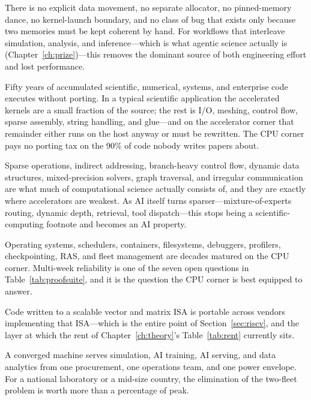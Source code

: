 \begin{description}\itemsep2pt
  \item[One address space, no host--device split.] There is no explicit data movement, no separate allocator, no pinned-memory dance, no kernel-launch boundary, and no class of bug that exists only because two memories must be kept coherent by hand. For workflows that interleave simulation, analysis, and inference---which is what agentic science actually is (Chapter~\ref{ch:prize})---this removes the dominant source of both engineering effort and lost performance.
  \item[The existing software universe runs natively.] Fifty years of accumulated scientific, numerical, systems, and enterprise code executes without porting. In a typical scientific application the accelerated kernels are a small fraction of the source; the rest is I/O, meshing, control flow, sparse assembly, string handling, and glue---and on the accelerator corner that remainder either runs on the host anyway or must be rewritten. The CPU corner pays no porting tax on the 90\% of code nobody writes papers about.
  \item[The irregular tail is native.] Sparse operations, indirect addressing, branch-heavy control flow, dynamic data structures, mixed-precision solvers, graph traversal, and irregular communication are what much of computational science actually consists of, and they are exactly where accelerators are weakest. As AI itself turns sparser---mixture-of-experts routing, dynamic depth, retrieval, tool dispatch---this stops being a scientific-computing footnote and becomes an AI property.
  \item[Mature operations.] Operating systems, schedulers, containers, filesystems, debuggers, profilers, checkpointing, RAS, and fleet management are decades matured on the CPU corner. Multi-week reliability is one of the seven open questions in Table~\ref{tab:proofsuite}, and it is the question the CPU corner is best equipped to answer.
  \item[No kernel-language lock-in.] Code written to a scalable vector and matrix ISA is portable across vendors implementing that ISA---which is the entire point of Section~\ref{sec:riscv}, and the layer at which the rent of Chapter~\ref{ch:theory}'s Table~\ref{tab:rent} currently sits.
  \item[One fleet instead of two.] A converged machine serves simulation, AI training, AI serving, and data analytics from one procurement, one operations team, and one power envelope. For a national laboratory or a mid-size country, the elimination of the two-fleet problem is worth more than a percentage of peak.
\end{description}

